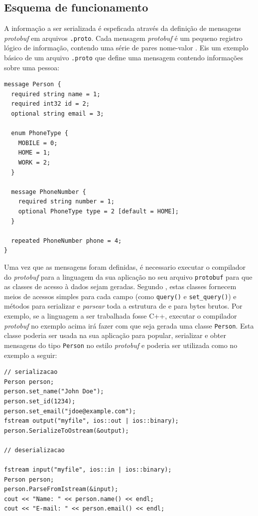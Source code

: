 \subsection{Esquema de funcionamento}

A informação a ser serializada é espeficada através da definição de mensagens \emph{protobuf} em arquivos \texttt{.proto}. Cada mensagem \emph{protobuf} é um pequeno registro lógico de informação, contendo uma série de pares nome-valor \cite{protobuf_overview} . Eis um exemplo básico de um arquivo \texttt{.proto} que define uma mensagem contendo informações sobre uma pessoa:

\pagebreak
{}
\begin{lstlisting}
message Person {
  required string name = 1;
  required int32 id = 2;
  optional string email = 3;

  enum PhoneType {
    MOBILE = 0;
    HOME = 1;
    WORK = 2;
  }

  message PhoneNumber {
    required string number = 1;
    optional PhoneType type = 2 [default = HOME];
  }

  repeated PhoneNumber phone = 4;
}
\end{lstlisting}


Uma vez que as mensagens foram definidas, é necessario executar o compilador do \emph{protobuf} para a linguagem da sua aplicação no seu arquivo \texttt{protobuf} para que as classes de acesso à dados sejam geradas. Segundo \cite{protobuf_overview}, estas classes fornecem meios de acessos simples para cada campo (como \texttt{query()} e  \texttt{set\_query()}) e métodos para serializar e \emph{parsear} toda a estrutura de e para bytes brutos. Por exemplo, se a linguagem a ser trabalhada fosse C++, executar o compilador \emph{protobuf} no exemplo acima irá fazer com que seja gerada uma classe \texttt{Person}. Esta classe poderia ser usada na sua aplicação para popular, serializar e obter mensagens do tipo \texttt{Person} no estilo \emph{protobuf} e poderia ser utilizada como no exemplo a seguir:

\pagebreak
{}
\begin{lstlisting}
// serializacao
Person person;
person.set_name("John Doe");
person.set_id(1234);
person.set_email("jdoe@example.com");
fstream output("myfile", ios::out | ios::binary);
person.SerializeToOstream(&output);	

// deserializacao

fstream input("myfile", ios::in | ios::binary);
Person person;
person.ParseFromIstream(&input);
cout << "Name: " << person.name() << endl;
cout << "E-mail: " << person.email() << endl;
\end{lstlisting}



